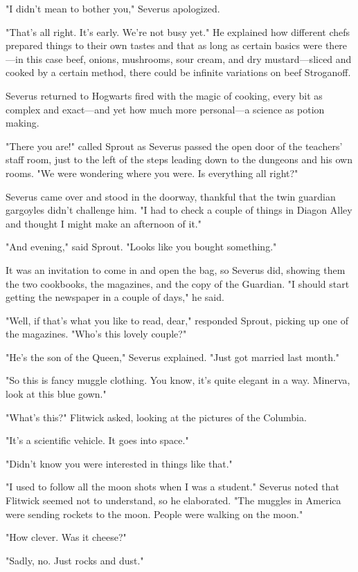 "I didn't mean to bother you," Severus apologized.

"That's all right. It's early. We're not busy yet." He explained how different chefs prepared things to their own tastes and that as long as certain basics were there—in this case beef, onions, mushrooms, sour cream, and dry mustard—sliced and cooked by a certain method, there could be infinite variations on beef Stroganoff.

Severus returned to Hogwarts fired with the magic of cooking, every bit as complex and exact—and yet how much more personal—a science as potion making.

"There you are!" called Sprout as Severus passed the open door of the teachers' staff room, just to the left of the steps leading down to the dungeons and his own rooms. "We were wondering where you were. Is everything all right?"

Severus came over and stood in the doorway, thankful that the twin guardian gargoyles didn't challenge him. "I had to check a couple of things in Diagon Alley and thought I might make an afternoon of it."

"And evening," said Sprout. "Looks like you bought something."

It was an invitation to come in and open the bag, so Severus did, showing them the two cookbooks, the magazines, and the copy of the Guardian. "I should start getting the newspaper in a couple of days," he said.

"Well, if that's what you like to read, dear," responded Sprout, picking up one of the magazines. "Who's this lovely couple?"

"He's the son of the Queen," Severus explained. "Just got married last month."

"So this is fancy muggle clothing. You know, it's quite elegant in a way. Minerva, look at this blue gown."

"What's this?" Flitwick asked, looking at the pictures of the Columbia.

"It's a scientific vehicle. It goes into space."

"Didn't know you were interested in things like that."

"I used to follow all the moon shots when I was a student." Severus noted that Flitwick seemed not to understand, so he elaborated. "The muggles in America were sending rockets to the moon. People were walking on the moon."

"How clever. Was it cheese?"

"Sadly, no. Just rocks and dust."

